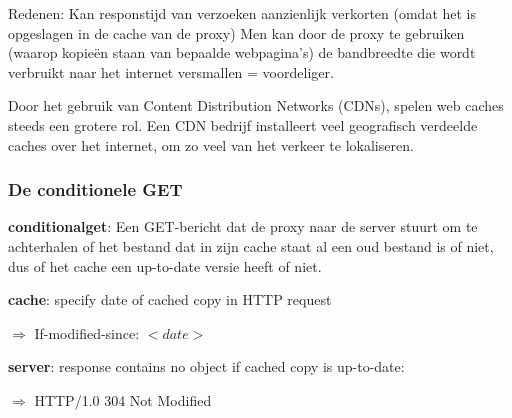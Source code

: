 \newpage

\noindent Redenen:
\bi
\itf Kan responstijd van verzoeken aanzienlijk verkorten (omdat het is opgeslagen in de cache van de proxy)
\itf Men kan door de proxy te gebruiken (waarop kopieën staan van bepaalde webpagina’s) de bandbreedte die wordt verbruikt naar het internet versmallen = voordeliger.
\ei

\noindent Door het gebruik van Content Distribution Networks (CDNs), spelen web caches steeds een grotere rol. Een CDN bedrijf installeert veel geografisch verdeelde caches over het internet, om zo veel van het verkeer te lokaliseren.

\subsubsection{De conditionele GET}

\noindent \textbf{\Gls{conditionalget}}: Een GET-bericht dat de proxy naar de server stuurt om te achterhalen of het bestand dat in zijn cache staat al een oud bestand is of niet, dus of het cache een up-to-date versie heeft of niet.

\noindent \textbf{\gls{cache}}: specify date of cached copy in HTTP request

\noindent $\Rightarrow$ If-modified-since: $<date>$

\noindent \textbf{server}: response contains no object if cached copy is up-to-date:

\noindent $\Rightarrow$ HTTP/1.0 304 Not Modified
